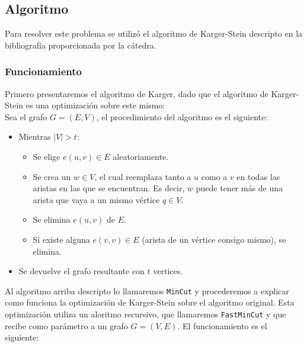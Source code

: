 \documentclass[a4paper, 10pt]{article}
\def\code#1{\texttt{#1}}
\begin{document}
        \subsection{Algoritmo}
                Para resolver este problema se utilizó el algoritmo de Karger-Stein descripto en
            la bibliografía proporcionada por la cátedra.
            \subsubsection{Funcionamiento}
                    Primero presentaremos el algoritmo de Karger, dado que el algoritmo de Karger-Stein
                es una optimización sobre este mismo: \\
                    Sea el grafo $G = (E, V)$, el procedimiento del algoritmo es el siguiente:
                    \begin{itemize}
                        \item Mientras $|V| > t$:
                        \begin{itemize}
                            \item Se elige $e(u, v) \in E$ aleatoriamente.
                            \item Se crea un $w \in V$, el cual reemplaza tanto a $u$ como a $v$ en todas
                            las aristas en las que se encuentran. Es decir, $w$ puede tener más de una arista
                            que vaya a un mismo vértice $q \in V$.
                            \item Se elimina $e(u, v)$ de $E$.
                            \item Si existe alguna $e(v, v) \in E$ (arista de un vértice consigo mismo), se elimina.
                        \end{itemize}
                        \item Se devuelve el grafo resultante con $t$ vertices.
                    \end{itemize}
                        Al algoritmo arriba descripto lo llamaremos \code{MinCut} y procederemos a explicar
                    como funciona la optimización de Karger-Stein sobre el algoritmo original.
                        Esta optimización utiliza un aloritmo recursivo, que llamaremos \code{FastMinCut} y que
                    recibe como parámetro a un grafo $G = (V, E)$. El funcionamiento es el siguiente:
\end{document}
